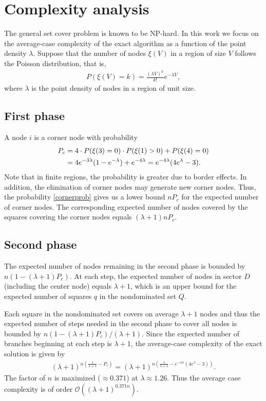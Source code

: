 \documentclass{article}
\begin{document}
\section{Complexity analysis}
The general set cover problem is known to be NP-hard. In this work we focus on the
average-case complexity of the exact algorithm as a function of the point
density $\lambda$. 
Suppose that the number of nodes $\xi(V)$ in a region of size $V$ follows the Poisson 
distribution, that is, 
\begin{align*}
P(\xi(V)=k) = \frac{(\lambda V)^k}{k!} e^{-\lambda V},
\end{align*}
where $\lambda$ is the point density of nodes in a region of unit size.

\subsection{First phase}
A node $i$ is a corner node with probability 
\begin{align}
\notag
P_c & =4 \cdot P(\xi(3)=0) \cdot P(\xi(1) > 0) + P(\xi(4)=0) \\ 
\label{cornerprob}
& = 4 e^{-3 \lambda} (1-e^{-\lambda}) + e^{-4 \lambda} = e^{-4 \lambda } (4 e^{\lambda }-3).
\end{align}
Note that in finite regions, the probability is greater due to border effects. In addition,
the elimination of corner nodes may generate new corner nodes. 
Thus, the probability \eqref{cornerprob} gives us a lower bound 
$nP_c$ for the expected number of corner nodes. 
The corresponding expected number of nodes covered by the squares 
covering the corner nodes equals $(\lambda + 1) n P_c$.

\subsection{Second phase}
The expected number of nodes remaining in the second phase is bounded
by $n(1-(\lambda + 1)P_c)$. At each step, the expected number of nodes 
in sector $D$ (including the center node) equals $\lambda + 1$, which is
an upper bound for the expected number of squares $q$ in the nondominated set $Q$.

Each square in the nondominated set covers on average $\lambda + 1$ nodes and thus the
expected number of steps needed in the second phase to cover all nodes is bounded by 
$n(1-(\lambda + 1)P_c) / (\lambda + 1)$. Since the expected number of branches beginning at 
each step is $\lambda + 1$, the average-case complexity of the exact solution is given by
\begin{align*}
(\lambda + 1)^{n(\frac{1}{\lambda + 1} - P_c)} = 
(\lambda+1)^{n(\frac{1}{\lambda + 1} - e^{-4 \lambda } (4 e^{\lambda }-3))}.
\end{align*}
The factor of $n$ is maximized ($\approx 0.371$) at $\lambda \approx 1.26$. Thus the average case 
complexity is of order $\mathcal{O}((\lambda+1)^{0.371 n})$.
\end{document}
